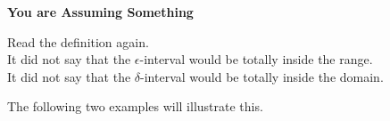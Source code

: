 \documentclass{ximera}
\begin{document}
\begin{warning} \textbf{\textcolor{red!80!black}{You are Assuming Something}}

Read the definition again. \\

It did not say that the $\epsilon$-interval would be totally inside the range. \\

It did not say that the $\delta$-interval would be totally inside the domain. \\

\end{warning}


The following two examples will illustrate this.
\end{document}
